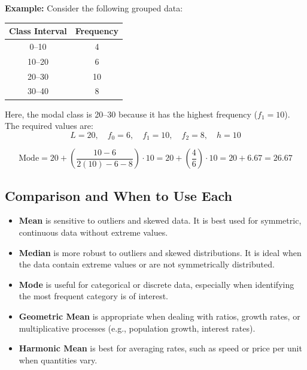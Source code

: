 \documentclass[twoside]{book}
\begin{document}
\begin{enumerate}
\begin{center}
\end{center}

\textbf{Example:} Consider the following grouped data:

\begin{center}
\begin{tabular}{c|c}
\hline
Class Interval & Frequency \\
\hline
0--10 & 4 \\
10--20 & 6 \\
20--30 & 10 \\
30--40 & 8 \\
\hline
\end{tabular}
\end{center}

Here, the modal class is 20--30 because it has the highest frequency (\( f_1 = 10 \)). The required values are:
\[
L = 20, \quad f_0 = 6, \quad f_1 = 10, \quad f_2 = 8, \quad h = 10
\]

\[
\text{Mode} = 20 + \left( \frac{10 - 6}{2(10) - 6 - 8} \right) \cdot 10 = 20 + \left( \frac{4}{6} \right) \cdot 10 = 20 + 6.67 = 26.67
\]

\end{enumerate}


\subsection{Comparison and When to Use Each}

\begin{itemize}
    \item \textbf{Mean} is sensitive to outliers and skewed data. It is best used for symmetric, continuous data without extreme values.

    \item \textbf{Median} is more robust to outliers and skewed distributions. It is ideal when the data contain extreme values or are not symmetrically distributed.

    \item \textbf{Mode} is useful for categorical or discrete data, especially when identifying the most frequent category is of interest.

    \item \textbf{Geometric Mean} is appropriate when dealing with ratios, growth rates, or multiplicative processes (e.g., population growth, interest rates).

    \item \textbf{Harmonic Mean} is best for averaging rates, such as speed or price per unit when quantities vary.

\end{itemize}
\end{document}
